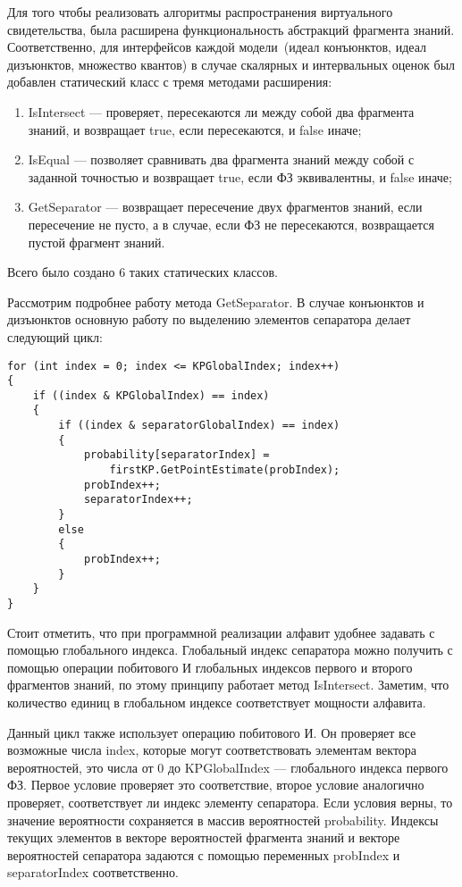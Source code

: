Для того чтобы реализовать алгоритмы распространения виртуального свидетельства, была расширена функциональность абстракций фрагмента знаний. Соответственно, для интерфейсов каждой модели~(идеал конъюнктов, идеал дизъюнктов, множество квантов) в случае скалярных и интервальных оценок был добавлен статический класс с тремя методами расширения: \begin{enumerate}
    \item IsIntersect --- проверяет, пересекаются ли между собой два фрагмента знаний, и возвращает true, если пересекаются, и false иначе;
    \item IsEqual --- позволяет сравнивать два фрагмента знаний между собой с заданной точностью и возвращает true, если ФЗ эквивалентны, и false иначе;
    \item GetSeparator --- возвращает пересечение двух фрагментов знаний, если пересечение не пусто, а в случае, если ФЗ не пересекаются, возвращается пустой фрагмент знаний.
\end{enumerate}

Всего было создано 6 таких статических классов.

Рассмотрим подробнее работу метода GetSeparator. В случае конъюнктов и дизъюнктов основную работу по выделению элементов сепаратора делает следующий цикл:

\begin{lstlisting}[caption = Цикл для выделения элементов виртуального свидетельства]
for (int index = 0; index <= KPGlobalIndex; index++)
{
    if ((index & KPGlobalIndex) == index)
    {
        if ((index & separatorGlobalIndex) == index)
        {
            probability[separatorIndex] =
                firstKP.GetPointEstimate(probIndex);
            probIndex++;
            separatorIndex++;
        }
        else
        {
            probIndex++;
        }
    }
}
\end{lstlisting}

Стоит отметить, что при программной реализации алфавит удобнее задавать с помощью глобального индекса. Глобальный индекс сепаратора можно получить с помощью операции побитового И глобальных индексов первого и второго фрагментов знаний, по этому принципу работает метод IsIntersect. Заметим, что количество единиц в глобальном индексе соответствует мощности алфавита. 

Данный цикл также использует операцию побитового И. Он проверяет все возможные числа index, которые могут соответствовать элементам вектора вероятностей, это числа от 0 до KPGlobalIndex --- глобального индекса первого ФЗ. Первое условие проверяет это соответствие, второе условие аналогично проверяет, соответствует ли индекс элементу сепаратора. Если условия верны, то значение вероятности сохраняется в массив вероятностей probability. Индексы текущих элементов в векторе вероятностей фрагмента знаний и векторе вероятностей сепаратора задаются с помощью переменных probIndex и separatorIndex соответственно.
 
